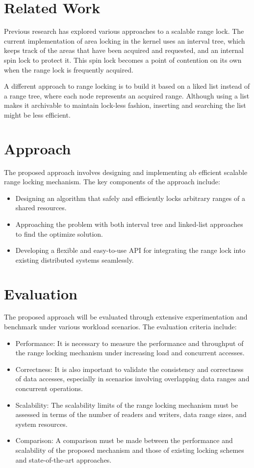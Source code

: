 \section{Related Work}
Previous research has explored various approaches to a scalable range lock. The current implementation of area locking in the kernel uses an interval tree, which keeps track of the areas that have been acquired and requested, and an internal spin lock to protect it. This spin lock becomes a point of contention on its own when the range lock is frequently acquired\parencite{scalableRangeLock2020}.

A different approach to range locking is to build it based on a liked list instead of a range tree, where each node represents an acquired range\parencite{scalableRangeLock2020}. Although using a list makes it archivable to maintain lock-less fashion, inserting and searching the list might be less efficient.

\section{Approach}
The proposed approach involves designing and implementing ab efficient scalable range locking mechanism. The key components of the approach include:
\begin{itemize}
    \item Designing an algorithm that safely and efficiently locks arbitrary ranges of a shared resources.
    \item Approaching the problem with both interval tree and linked-list approaches to find the optimize solution.
    \item Developing a flexible and easy-to-use API for integrating the range lock into existing distributed systems seamlessly.
\end{itemize}

\section{Evaluation}
The proposed approach will be evaluated through extensive experimentation and benchmark under various workload scenarios. The evaluation criteria include:
\begin{itemize}
    \item Performance: It is necessary to measure the performance and throughput of the range locking mechanism under increasing load and concurrent accesses.
    \item Correctness: It is also important to validate the consistency and correctness of data accesses, especially in scenarios involving overlapping data ranges and concurrent operations.
    \item Scalability:  The scalability limits of the range locking mechanism must be assessed in terms of the number of readers and writers, data range sizes, and system resources.
    \item Comparison: A comparison must be made between the performance and scalability of the proposed mechanism and those of existing locking schemes and state-of-the-art approaches.
\end{itemize}


